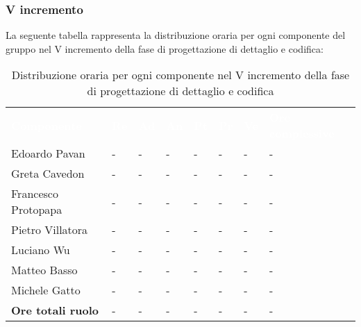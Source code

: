 \subsubsection{V incremento}
La seguente tabella rappresenta la distribuzione oraria per ogni componente del gruppo nel V incremento della fase di progettazione di dettaglio e codifica:
\begin{table}[!htbp]
\begin{center}
\renewcommand{\arraystretch}{1.25}
\begin{tabular}{ m{}<{\centering}  m{}<{\centering} m{}<{\centering} m{}<{\centering}  m{}<{\centering}  m{}<{\centering}  m{}<{\centering}  m{}<{\centering}   }
	\rowcolor{darkblue}
	\textcolor{white}{\textbf{Componente}} &\textcolor{white}{\textbf{Re}}&\textcolor{white}{\textbf{Ad}}&\textcolor{white}{\textbf{An}}&\textcolor{white}{\textbf{Pt}}&\textcolor{white}{\textbf{Pr}}&\textcolor{white}{\textbf{Ve}}&\textcolor{white}{\textbf{Ore complessive}}\\ 

	Edoardo Pavan & - & - & - & - & - & - & -\\	

	Greta Cavedon & - & - & - & - & - & - & -\\
	
	Francesco Protopapa & - & - & - & - & - & - & -\\
	
	Pietro Villatora & - & - & - & - & - & - & -\\
	
	Luciano Wu & - & - & - & - & - & - & -\\
	
	Matteo Basso & - & - & - & - & - & - & -\\
	
	Michele Gatto & - & - & - & - & - & - & -\\
	
	\textbf{Ore totali ruolo} & - & - & - & - & - & - & -\\

\end{tabular}
\caption{Distribuzione oraria per ogni componente nel V incremento della fase di progettazione di dettaglio e codifica}
\end{center}
\end{table}

